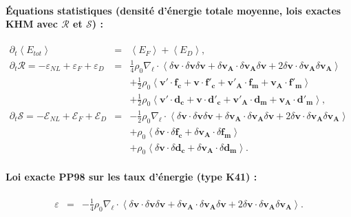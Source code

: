 {\begin{minipage}[c]{\linewidth}
\paragraph{Équations statistiques (densité d'énergie totale moyenne, lois exactes KHM avec $\mathcal{R}$ et $\mathcal{S}$) :}  
\begin{eqnarray}
\label{eq:synth_inc_E} \partial_t \left<E_{tot}\right> &=& \left<E_{F}\right> + \left<E_{D}\right>, \\
 \label{eq:synth_inc_R}    \partial_t \mathcal{R} = - \varepsilon_{NL} + \varepsilon_{F} + \varepsilon_{D} 
    &=& \frac{1}{4} \rho_0 \nabla_{\boldsymbol{\ell}} \cdot \left< \delta \boldsymbol{v} \cdot \delta \boldsymbol{v} \delta \boldsymbol{v} + \delta \boldsymbol{v_A} \cdot \delta \boldsymbol{v_A} \delta \boldsymbol{v} + 2 \delta \boldsymbol{v} \cdot \delta \boldsymbol{v_A} \delta \boldsymbol{v_A}\right> \nonumber \\
    &&+ \frac{1}{2} \rho_0  \left<\boldsymbol{v'} \cdot \boldsymbol{f_c} + \boldsymbol{v} \cdot \boldsymbol{f'_c} + \boldsymbol{v'_A} \cdot \boldsymbol{f_m} + \boldsymbol{v_A} \cdot \boldsymbol{f'_m}\right> \nonumber\\
    &&+ \frac{1}{2} \rho_0 \left<\boldsymbol{v'} \cdot \boldsymbol{d_c} +\boldsymbol{v} \cdot \boldsymbol{d'_c} + \boldsymbol{v'_A} \cdot \boldsymbol{d_m} + \boldsymbol{v_A} \cdot \boldsymbol{d'_m}\right>, \\
 \label{eq:synth_inc_S}   \partial_t \mathcal{S} = - \mathcal{E}_{NL} + \mathcal{E}_{F} + \mathcal{E}_{D} 
    &=&  -\frac{1}{2} \rho_0 \nabla_{\boldsymbol{\ell}} \cdot \left< \delta \boldsymbol{v} \cdot \delta \boldsymbol{v} \delta \boldsymbol{v} + \delta \boldsymbol{v_A} \cdot \delta \boldsymbol{v_A} \delta \boldsymbol{v} + 2 \delta \boldsymbol{v} \cdot \delta \boldsymbol{v_A} \delta \boldsymbol{v_A}\right> \nonumber\\
    &&+ \rho_0 \left<\delta \boldsymbol{v} \cdot \delta \boldsymbol{f_c} + \delta \boldsymbol{v_A} \cdot \delta \boldsymbol{f_m} \right> \nonumber\\ 
    &&+ \rho_0 \left<\delta \boldsymbol{v} \cdot \delta \boldsymbol{d_c} + \delta \boldsymbol{v_A} \cdot \delta \boldsymbol{d_m}\right>.
\end{eqnarray}

\paragraph{Loi exacte PP98 sur les taux d'énergie (type K41) :} 
\begin{eqnarray}
 \label{eq:synth_inc_EL}   \varepsilon &=& - \frac{1}{4} \rho_0 \nabla_{\boldsymbol{\ell}} \cdot \left< \delta \boldsymbol{v} \cdot \delta \boldsymbol{v} \delta \boldsymbol{v} + \delta \boldsymbol{v_A} \cdot \delta \boldsymbol{v_A} \delta \boldsymbol{v} + 2 \delta \boldsymbol{v} \cdot \delta \boldsymbol{v_A} \delta \boldsymbol{v_A}\right>. 
\end{eqnarray}
\end{minipage}}


 
